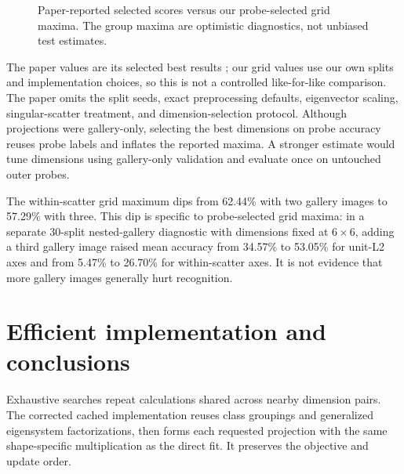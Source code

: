 \documentclass{article}
\begin{document}
\begin{figure}[H]
\centering
{}
\caption{Paper-reported selected scores versus our probe-selected grid maxima. The group maxima are optimistic diagnostics, not unbiased test estimates.}
\label{fig:grid-results}
\end{figure}

The paper values are its selected best results \citep{Yan2007MDA}; our grid values use our own splits and implementation choices, so this is not a controlled like-for-like comparison. The paper omits the split seeds, exact preprocessing defaults, eigenvector scaling, singular-scatter treatment, and dimension-selection protocol. Although projections were gallery-only, selecting the best dimensions on probe accuracy reuses probe labels and inflates the reported maxima. A stronger estimate would tune dimensions using gallery-only validation and evaluate once on untouched outer probes.

The within-scatter grid maximum dips from 62.44\% with two gallery images to 57.29\% with three. This dip is specific to probe-selected grid maxima: in a separate 30-split nested-gallery diagnostic with dimensions fixed at $6\times6$, adding a third gallery image raised mean accuracy from 34.57\% to 53.05\% for unit-L2 axes and from 5.47\% to 26.70\% for within-scatter axes. It is not evidence that more gallery images generally hurt recognition.

\section{Efficient implementation and conclusions}
Exhaustive searches repeat calculations shared across nearby dimension pairs. The corrected cached implementation reuses class groupings and generalized eigensystem factorizations, then forms each requested projection with the same shape-specific multiplication as the direct fit. It preserves the objective and update order.
\end{document}
